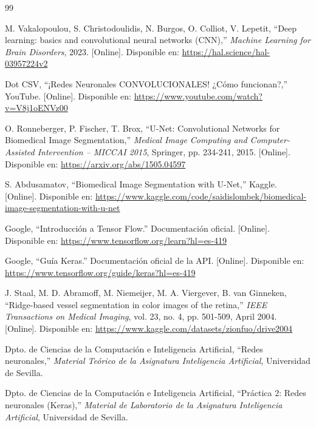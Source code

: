 \documentclass[conference]{IEEEtran}
\begin{document}
\begin{thebibliography}{99}

M. Vakalopoulou, S. Christodoulidis, N. Burgos, O. Colliot, V. Lepetit, ``Deep learning: basics and convolutional neural networks (CNN),'' \textit{Machine Learning for Brain Disorders}, 2023. [Online]. Disponible en: \url{https://hal.science/hal-03957224v2}

Dot CSV, ``¡Redes Neuronales CONVOLUCIONALES! ¿Cómo funcionan?,'' YouTube. [Online]. Disponible en: \url{https://www.youtube.com/watch?v=V8j1oENVz00}

O. Ronneberger, P. Fischer, T. Brox, ``U-Net: Convolutional Networks for Biomedical Image Segmentation,'' \textit{Medical Image Computing and Computer-Assisted Intervention – MICCAI 2015}, Springer, pp. 234-241, 2015. [Online]. Disponible en: \url{https://arxiv.org/abs/1505.04597}

S. Abdusamatov, ``Biomedical Image Segmentation with U-Net,'' Kaggle. [Online]. Disponible en: \url{https://www.kaggle.com/code/saidislombek/biomedical-image-segmentation-with-u-net}

Google, ``Introducción a Tensor Flow.'' Documentación oficial. [Online]. Disponible en: \url{https://www.tensorflow.org/learn?hl=es-419}

Google, ``Guía Keras.'' Documentación oficial de la API. [Online]. Disponible en: \url{https://www.tensorflow.org/guide/keras?hl=es-419}

J. Staal, M. D. Abramoff, M. Niemeijer, M. A. Viergever, B. van Ginneken, ``Ridge-based vessel segmentation in color images of the retina,'' \textit{IEEE Transactions on Medical Imaging}, vol. 23, no. 4, pp. 501-509, April 2004. [Online]. Disponible en: \url{https://www.kaggle.com/datasets/zionfuo/drive2004}

Dpto. de Ciencias de la Computación e Inteligencia Artificial, ``Redes neuronales,'' \textit{Material Teórico de la Asignatura Inteligencia Artificial}, Universidad de Sevilla.

Dpto. de Ciencias de la Computación e Inteligencia Artificial, ``Práctica 2: Redes neuronales (Keras),'' \textit{Material de Laboratorio de la Asignatura Inteligencia Artificial}, Universidad de Sevilla.

\end{thebibliography}
\end{document}
